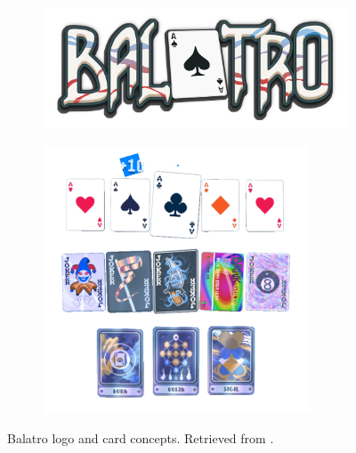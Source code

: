 \documentclass[a4paper,10pt,english]{article}
\begin{document}
\begin{figure}[H]
    \centering
    \begin{subfigure}[t]{0.45\linewidth}
        \includegraphics[width=\linewidth]{img/Balatro_logo.png}
        \caption{}
        \label{Fig:Style1A}
    \end{subfigure}
    \hfill
    \begin{subfigure}[t]{0.45\linewidth}
        \includegraphics[width=\linewidth]{img/balatro.png}
        \caption{}
        \label{Fig:Style1B}
    \end{subfigure}
    \caption{Balatro logo and card concepts. Retrieved from \cite{balatro2024, balatro_official2024}.}
    \label{Fig:StyleComparison}
\end{figure}

\newpage


\end{document}
